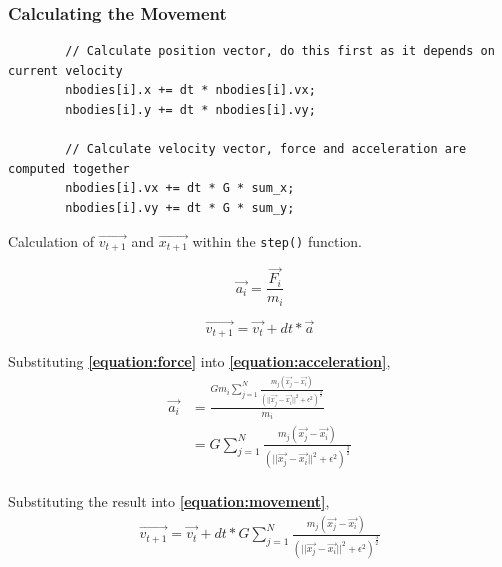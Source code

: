 \documentclass[12pt, a4paper]{article}
\let\oldcref\cref
\renewcommand{\cref}[1]{\textbf{\oldcref{#1}}}
\begin{document}
\subsubsection{Calculating the Movement} \label{subsec:calculate_movement}
\begin{listing}[ht]
  \begin{verbatim}
        // Calculate position vector, do this first as it depends on current velocity
        nbodies[i].x += dt * nbodies[i].vx;
        nbodies[i].y += dt * nbodies[i].vy;

        // Calculate velocity vector, force and acceleration are computed together
        nbodies[i].vx += dt * G * sum_x;
        nbodies[i].vy += dt * G * sum_y;
  \end{verbatim}
  \caption{Calculation of $\vec{v_{t+1}}$ and $\vec{x_{t+1}}$ within the \texttt{step()} function.}
  \label{listing:calculate_movement}
\end{listing}

\begin{equation}
  \vec{a_i} = \frac{\vec{F_i}}{m_i}
  \label{equation:acceleration}
\end{equation}

\begin{equation}
  \vec{v_{t+1}} = \vec{v_t} + dt * \vec{a}
  \label{equation:movement}
\end{equation}

Substituting \cref{equation:force} into \cref{equation:acceleration},
\begin{equation*}
  \begin{aligned}
    \vec{a_i} &= \frac{Gm_i \sum_{j=1}^{N} \frac{m_j(\vec{x_j} - \vec{x_i})}{(||\vec{x_j} - \vec{x_i}||^2 + \epsilon^2)^\frac{3}{2}}}{m_i} \\
              &= G \sum_{j=1}^{N} \frac{m_j(\vec{x_j} - \vec{x_i})}{(||\vec{x_j} - \vec{x_i}||^2 + \epsilon^2)^\frac{3}{2}} \\
  \end{aligned}
\end{equation*}

Substituting the result into \cref{equation:movement},
\begin{equation*}
  \begin{aligned}
    \vec{v_{t+1}} = \vec{v_t} + dt * G \sum_{j=1}^{N} \frac{m_j(\vec{x_j} - \vec{x_i})}{(||\vec{x_j} - \vec{x_i}||^2 + \epsilon^2)^\frac{3}{2}} \\
  \end{aligned}
\end{equation*}
\end{document}

